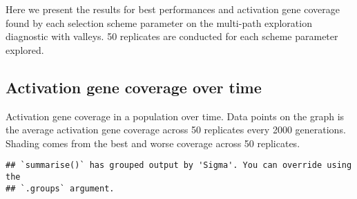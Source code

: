 \documentclass[]{book}
\newenvironment{Shaded}{\begin{snugshade}}{\end{snugshade}}
\newcommand{\DataTypeTok}[1]{\textcolor[rgb]{0.13,0.29,0.53}{#1}}
\newcommand{\KeywordTok}[1]{\textcolor[rgb]{0.13,0.29,0.53}{\textbf{#1}}}
\newcommand{\NormalTok}[1]{#1}
\newcommand{\OperatorTok}[1]{\textcolor[rgb]{0.81,0.36,0.00}{\textbf{#1}}}
\newcommand{\StringTok}[1]{\textcolor[rgb]{0.31,0.60,0.02}{#1}}
\begin{document}
Here we present the results for best performances and activation gene coverage found by each selection scheme parameter on the multi-path exploration diagnostic with valleys.
50 replicates are conducted for each scheme parameter explored.

\hypertarget{activation-gene-coverage-over-time-5}{%
\subsection{Activation gene coverage over time}\label{activation-gene-coverage-over-time-5}}

Activation gene coverage in a population over time.
Data points on the graph is the average activation gene coverage across 50 replicates every 2000 generations.
Shading comes from the best and worse coverage across 50 replicates.

\begin{Shaded}
\end{Shaded}

\begin{verbatim}
## `summarise()` has grouped output by 'Sigma'. You can override using the
## `.groups` argument.
\end{verbatim}
\end{document}
